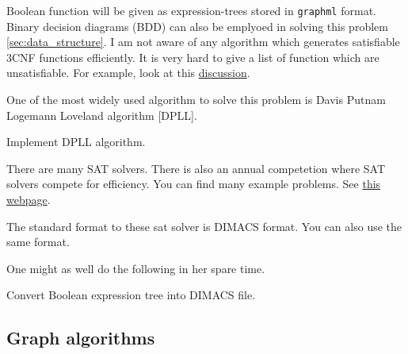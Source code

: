   Boolean function will be given as expression-trees stored in \texttt{graphml}
  format.  Binary decision diagrams (BDD) can also be emplyoed in solving this
  problem \ref{sec:data_structure}. I am not aware of any algorithm which
  generates satisfiable 3CNF functions efficiently. It is very hard to give a
  list of function which are unsatisfiable. For example, look at this
  \href{http://cstheory.stackexchange.com/questions/8117/minimum-unsatisfiable-3-cnf-formulae}{discussion}.

  One of the most widely used algorithm to solve this problem is 
  Davis Putnam Logemann Loveland algorithm [DPLL].

    \begin{problem}[30] 
      Implement DPLL algorithm.
    \end{problem}

    \begin{remark}

    There are many SAT solvers. There is also an annual competetion where SAT
    solvers compete for efficiency. You can find many example problems. See
    \href{http://www.satcompetition.org/}{this webpage}.

    The standard format to these sat solver is DIMACS format. You can also use
    the same format.

    \end{remark}

    One might as well do the following in her spare time.

    \begin{problem}[20]
      Convert Boolean expression tree into DIMACS file.
    \end{problem}

  \begin{comment}
    Make sense of Tweedledee comment quoted at the begining of this section. 
    Lewis Carroll was a logician, so it is likely that this comment is logically
    consistent. 
    
    One solution is due to C. Sartena. Tweedledee is describing the implication
    $x \implies y$. What he actually wants to say is "Contrariwise, if y is so,
    x might be, and if x were so, y would be; but as y isn't; x ain't. Thats
    logic!".  
    
  \end{comment}


\subsection{Graph algorithms}
\label{sec:graph_algorithms}

